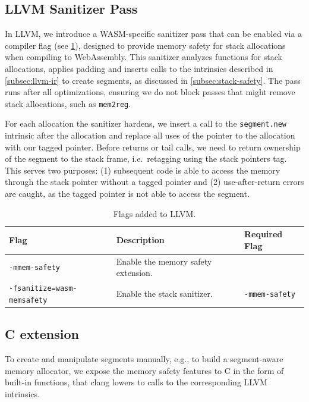 \subsection{LLVM Sanitizer Pass}
\label{subsec:llvm-sanitizer-pass}

In LLVM, we introduce a \ac{WASM}-specific sanitizer pass that can be enabled via a compiler flag (see \cref{tab:llvm-flags}), designed to provide memory safety for stack allocations when compiling to WebAssembly.
This sanitizer analyzes functions for stack allocations, applies padding and inserts calls to the intrinsics described in \cref{subsec:llvm-ir} to create segments, as discussed in \cref{subsec:stack-safety}.
The pass runs after all optimizations, ensuring we do not block passes that might remove stack allocations, such as \texttt{mem2reg}.

For each allocation the sanitizer hardens, we insert a call to the \texttt{segment.new} intrinsic after the allocation and replace all uses of the pointer to the allocation with our tagged pointer.
Before returns or tail calls, we need to return ownership of the segment to the stack frame, i.e.\ retagging using the stack pointers tag.
This serves two purposes: (1) subsequent code is able to access the memory through the stack pointer without a tagged pointer and (2) use-after-return errors are caught, as the tagged pointer is not able to access the segment.

\begin{table}[t]
  \centering
  \begin{tabular}{l | l | l}
    \textbf{Flag} & \textbf{Description} & \textbf{Required Flag} \\
    \hline
    \texttt{-mmem-safety}              & Enable the memory safety extension. & \\
    \texttt{-fsanitize=wasm-memsafety} & Enable the stack sanitizer. & \texttt{-mmem-safety} \\
  \end{tabular}
  \caption{Flags added to LLVM.}
  \label{tab:llvm-flags}
\end{table}

\subsection{C extension}
\label{subsec:c-extension}

To create and manipulate segments manually, e.g., to build a segment-aware memory allocator, we expose the memory safety features to C in the form of built-in functions, that clang lowers to calls to the corresponding LLVM intrinsics.

